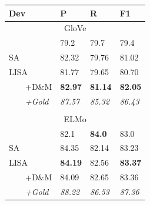 \documentclass[11pt,a4paper]{article}
\begin{document}
\begin{table}
\begin{tabular}{llll}
Dev & P & R & F1 \\ \hline \hline
\multicolumn{4}{c}{GloVe} \\ \hline
\citet{he2018jointly} & 79.2 & 79.7 & 79.4 \\ \hline
SA & 82.32 & 79.76 & 81.02 \\ %
LISA & 81.77 & 79.65 & 80.70 \\
\ \ \ \ +D\&M & {\bf 82.97} & {\bf 81.14} &	{\bf 82.05} \\
\ \ \ \ \emph{+Gold} & \emph{87.57} & \emph{85.32} & \emph{86.43} \\ 
\hline
 & & & \\
\multicolumn{4}{c}{ELMo} \\ \hline
\citet{he2018jointly} & 82.1 & {\bf 84.0} & 83.0 \\ \hline
SA & 84.35 & 82.14 & 83.23 \\ %
LISA & {\bf 84.19} & 82.56 & {\bf 83.37} \\
\ \ \ \ +D\&M & 84.09 & 82.65 & 83.36 \\
\ \ \ \ \emph{+Gold} & \emph{88.22} & \emph{86.53} & \emph{87.36} \\


\end{tabular}
\end{table}
\end{document}

